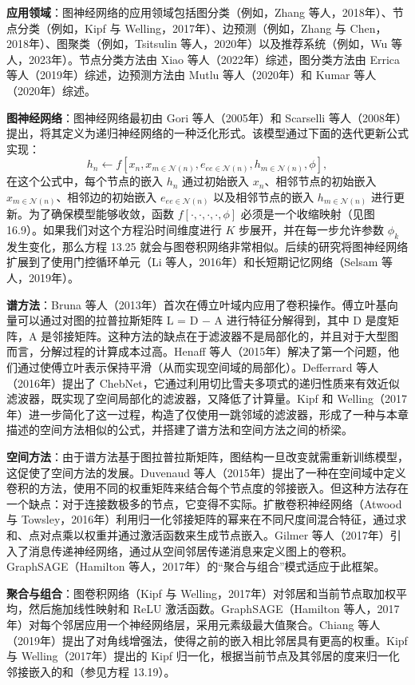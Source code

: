 \textbf{应用领域}：图神经网络的应用领域包括图分类（例如，Zhang 等人，2018年）、节点分类（例如，Kipf 与 Welling，2017年）、边预测（例如，Zhang 与 Chen，2018年）、图聚类（例如，Tsitsulin 等人，2020年）以及推荐系统（例如，Wu 等人，2023年）。节点分类方法由 Xiao 等人（2022年）综述，图分类方法由 Errica 等人（2019年）综述，边预测方法由 Mutlu 等人（2020年）和 Kumar 等人（2020年）综述。

\textbf{图神经网络}：图神经网络最初由 Gori 等人（2005年）和 Scarselli 等人（2008年）提出，将其定义为递归神经网络的一种泛化形式。该模型通过下面的迭代更新公式实现：
\[
h_n \leftarrow f \left[ x_n, x_{m\in \mathcal{N}(n)}, e_{ee\in \mathcal{N}(n)}, h_{m\in \mathcal{N}(n)}, \phi \right], \tag{13.25}
\]
在这个公式中，每个节点的嵌入 \(h_n\) 通过初始嵌入 \(x_n\)、相邻节点的初始嵌入 \(x_{m\in \mathcal{N}(n)}\)、相邻边的初始嵌入 \(e_{ee\in \mathcal{N}(n)}\) 以及相邻节点的嵌入 \(h_{m\in \mathcal{N}(n)}\) 进行更新。为了确保模型能够收敛，函数 \(f[\cdot, \cdot, \cdot, \cdot, \phi]\) 必须是一个收缩映射（见图 16.9）。如果我们对这个方程沿时间维度进行 \(K\) 步展开，并在每一步允许参数 \(\phi_k\) 发生变化，那么方程 13.25 就会与图卷积网络非常相似。后续的研究将图神经网络扩展到了使用门控循环单元（Li 等人，2016年）和长短期记忆网络（Selsam 等人，2019年）。

\textbf{谱方法}：Bruna 等人（2013年）首次在傅立叶域内应用了卷积操作。傅立叶基向量可以通过对图的拉普拉斯矩阵 L = D − A 进行特征分解得到，其中 D 是度矩阵，A 是邻接矩阵。这种方法的缺点在于滤波器不是局部化的，并且对于大型图而言，分解过程的计算成本过高。Henaff 等人（2015年）解决了第一个问题，他们通过使傅立叶表示保持平滑（从而实现空间域的局部化）。Defferrard 等人（2016年）提出了 ChebNet，它通过利用切比雪夫多项式的递归性质来有效近似滤波器，既实现了空间局部化的滤波器，又降低了计算量。Kipf 和 Welling（2017年）进一步简化了这一过程，构造了仅使用一跳邻域的滤波器，形成了一种与本章描述的空间方法相似的公式，并搭建了谱方法和空间方法之间的桥梁。

\textbf{空间方法}：由于谱方法基于图拉普拉斯矩阵，图结构一旦改变就需重新训练模型，这促使了空间方法的发展。Duvenaud 等人（2015年）提出了一种在空间域中定义卷积的方法，使用不同的权重矩阵来结合每个节点度的邻接嵌入。但这种方法存在一个缺点：对于连接数极多的节点，它变得不实际。扩散卷积神经网络（Atwood 与 Towsley，2016年）利用归一化邻接矩阵的幂来在不同尺度间混合特征，通过求和、点对点乘以权重并通过激活函数来生成节点嵌入。Gilmer 等人（2017年）引入了消息传递神经网络，通过从空间邻居传递消息来定义图上的卷积。GraphSAGE（Hamilton 等人，2017年）的“聚合与组合”模式适应于此框架。

\textbf{聚合与组合}：图卷积网络（Kipf 与 Welling，2017年）对邻居和当前节点取加权平均，然后施加线性映射和 ReLU 激活函数。GraphSAGE（Hamilton 等人，2017年）对每个邻居应用一个神经网络层，采用元素级最大值聚合。Chiang 等人（2019年）提出了对角线增强法，使得之前的嵌入相比邻居具有更高的权重。Kipf 与 Welling（2017年）提出的 Kipf 归一化，根据当前节点及其邻居的度来归一化邻接嵌入的和（参见方程 13.19）。

